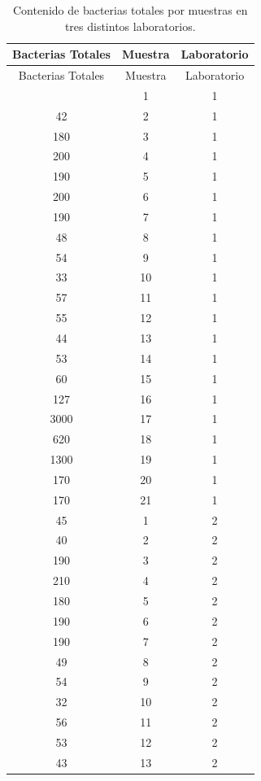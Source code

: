 \documentclass[a4paper,12pt]{article}
\begin{document}
\begin{center}
		\begin{longtable}{c|c|c}
			\caption{Contenido de bacterias totales por muestras en tres distintos laboratorios.} \label{tab:example} \\
			\hline
			\textbf{Bacterias Totales} & \textbf{Muestra} &\textbf{Laboratorio }\\
			\hline
			\endfirsthead
			\hline
			Bacterias Totales & Muestra & Laboratorio \\
			\hline
			\endhead
			\hline
			\endfoot
			\hline
			\endlastfoot
			44  & 1  & 1  \\
			42  & 2  & 1  \\
			180 & 3  & 1  \\
			200 & 4  & 1  \\
			190 & 5  & 1  \\
			200 & 6  & 1  \\
			190 & 7  & 1  \\
			48  & 8  & 1  \\
			54  & 9  & 1  \\
			33  & 10 & 1  \\
			57  & 11 & 1  \\
			55  & 12 & 1  \\
			44  & 13 & 1  \\
			53  & 14 & 1  \\
			60  & 15 & 1  \\
			127 & 16 & 1  \\
			3000& 17 & 1  \\
			620 & 18 & 1  \\
			1300& 19 & 1  \\
			170 & 20 & 1  \\
			170 & 21 & 1  \\
			45  & 1  & 2  \\
			40  & 2  & 2  \\
			190 & 3  & 2  \\
			210 & 4  & 2  \\
			180 & 5  & 2  \\
			190 & 6  & 2  \\
			190 & 7  & 2  \\
			49  & 8  & 2  \\
			54  & 9  & 2  \\
			32  & 10 & 2  \\
			56  & 11 & 2  \\
			53  & 12 & 2  \\
			43  & 13 & 2  \\

\end{longtable}
\end{center}
\end{document}
